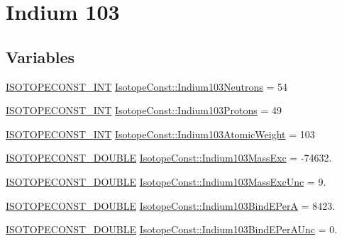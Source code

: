 \hypertarget{group___isotope_const-_indium-_in103}{}\section{Indium 103}
\label{group___isotope_const-_indium-_in103}
\subsection*{Variables}
\begin{DoxyCompactItemize}
\item 
\mbox{\hyperlink{group___isotope_const-_macros_ga5f18360b3e99483a35c32d789e62621c}{I\+S\+O\+T\+O\+P\+E\+C\+O\+N\+S\+T\+\_\+\+I\+NT}} \mbox{\hyperlink{group___isotope_const-_indium-_in103_gafca4c5d341d03d983d61c543bccb492f}{Isotope\+Const\+::\+Indium103\+Neutrons}} = 54
\item 
\mbox{\hyperlink{group___isotope_const-_macros_ga5f18360b3e99483a35c32d789e62621c}{I\+S\+O\+T\+O\+P\+E\+C\+O\+N\+S\+T\+\_\+\+I\+NT}} \mbox{\hyperlink{group___isotope_const-_indium-_in103_ga9c45d312f015a65ab221e226ef3b8942}{Isotope\+Const\+::\+Indium103\+Protons}} = 49
\item 
\mbox{\hyperlink{group___isotope_const-_macros_ga5f18360b3e99483a35c32d789e62621c}{I\+S\+O\+T\+O\+P\+E\+C\+O\+N\+S\+T\+\_\+\+I\+NT}} \mbox{\hyperlink{group___isotope_const-_indium-_in103_ga31f897aab54382b5d93111bedd3b1f7a}{Isotope\+Const\+::\+Indium103\+Atomic\+Weight}} = 103
\item 
\mbox{\hyperlink{group___isotope_const-_macros_ga8f45a7272ce02c0b4c65c44636ed719a}{I\+S\+O\+T\+O\+P\+E\+C\+O\+N\+S\+T\+\_\+\+D\+O\+U\+B\+LE}} \mbox{\hyperlink{group___isotope_const-_indium-_in103_ga61677aefd941074749ae189fe3528e53}{Isotope\+Const\+::\+Indium103\+Mass\+Exc}} = -\/74632.
\item 
\mbox{\hyperlink{group___isotope_const-_macros_ga8f45a7272ce02c0b4c65c44636ed719a}{I\+S\+O\+T\+O\+P\+E\+C\+O\+N\+S\+T\+\_\+\+D\+O\+U\+B\+LE}} \mbox{\hyperlink{group___isotope_const-_indium-_in103_gadfc7ae63efea6c82aac69f8bbcf34299}{Isotope\+Const\+::\+Indium103\+Mass\+Exc\+Unc}} = 9.
\item 
\mbox{\hyperlink{group___isotope_const-_macros_ga8f45a7272ce02c0b4c65c44636ed719a}{I\+S\+O\+T\+O\+P\+E\+C\+O\+N\+S\+T\+\_\+\+D\+O\+U\+B\+LE}} \mbox{\hyperlink{group___isotope_const-_indium-_in103_ga53ffbfb3c49421f6f6797f99f0ac9686}{Isotope\+Const\+::\+Indium103\+Bind\+E\+PerA}} = 8423.
\item 
\mbox{\hyperlink{group___isotope_const-_macros_ga8f45a7272ce02c0b4c65c44636ed719a}{I\+S\+O\+T\+O\+P\+E\+C\+O\+N\+S\+T\+\_\+\+D\+O\+U\+B\+LE}} \mbox{\hyperlink{group___isotope_const-_indium-_in103_gad985173fa8e455db5c60b3d7da3fbe61}{Isotope\+Const\+::\+Indium103\+Bind\+E\+Per\+A\+Unc}} = 0.

\end{DoxyCompactItemize}
